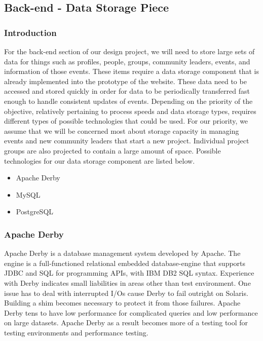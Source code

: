 \documentclass[draftclsnofoot,10pt,onecolumn]{IEEEtran} %
\begin{document}
\subsection{Back-end - Data Storage Piece}

\subsubsection{Introduction}
For the back-end section of our design project, we will need to store large sets of data for things such as profiles, people,
groups, community leaders, events, and information of those events. These items require a data storage component that is
already implemented into the prototype of the website. These data need to be accessed and stored quickly in order for data to
be periodically transferred fast enough to handle consistent updates of events. Depending on the priority of the objective,
relatively pertaining to process speeds and data storage types, requires different types of possible technologies that could be
used. For our priority, we assume that we will be concerned most about storage capacity in managing events and new
community leaders that start a new project. Individual project groups are also projected to contain a large amount of space.
Possible technologies for our data storage component are listed below. \\

	\begin{itemize}
		\item Apache Derby
		\item MySQL
		\item PostgreSQL \\
	\end{itemize}
	
\subsubsection{Apache Derby}
Apache Derby is a database management system developed by Apache. The engine is a full-functioned relational embedded
database-engine that supports JDBC and SQL for programming APIs, with IBM DB2 SQL syntax. Experience with Derby
indicates small liabilities in areas other than test environment. One issue has to deal with interrupted I/Os cause Derby to fail
outright on Solaris. Building a shim becomes necessary to protect it from those failures. Apache Derby tens to have low
performance for complicated queries and low performance on large datasets. Apache Derby as a result becomes more of a
testing tool for testing environments and performance testing. \\
\end{document}
